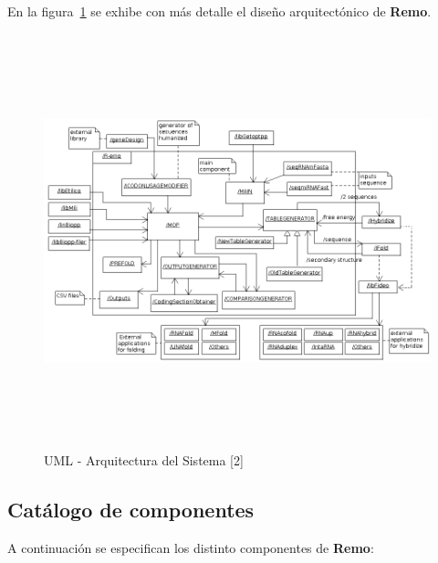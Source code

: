 \par En la figura~\ref{arquitecture} se exhibe con más detalle el diseño arquitectónico de \textbf{Remo}.

\begin{figure}[!hbtp]
	\begin{center}
		\includegraphics[width=20cm, height=12cm, angle=90]{image/arquitectura.png}
		\caption{UML - Arquitectura del Sistema [2]} 
		\label{arquitecture}
	\end{center}
\end{figure}

\subsection{Catálogo de componentes}
\par A continuación se especifican los distinto componentes de \textbf{Remo}:

